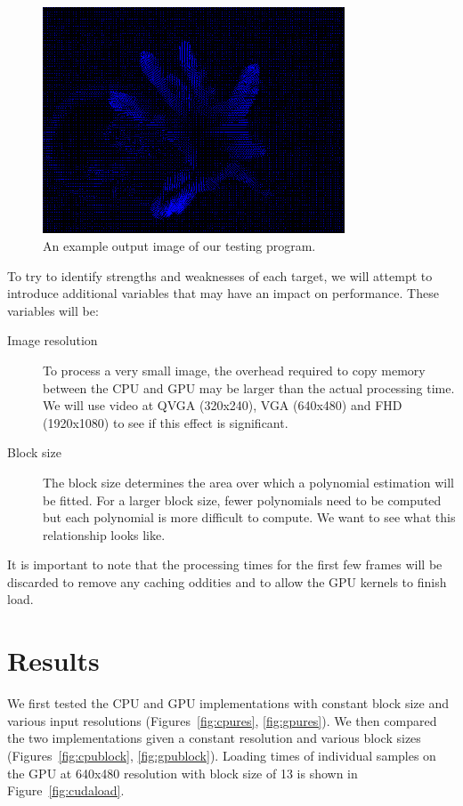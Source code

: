 \documentclass[12pt,letterpaper]{article}
\begin{document}
\begin{figure}[h]
  \centering
  \includegraphics[width=0.8\textwidth]{img/flow.png}
  \caption{An example output image of our testing program.}
  \label{fig:flow}
\end{figure}

To try to identify strengths and weaknesses of each target, we will attempt to
introduce additional variables that may have an impact on performance. These
variables will be:

\begin{description}
  \item[Image resolution] To process a very small image, the overhead required
    to copy memory between the CPU and GPU may be larger than the actual
    processing time. We will use video at QVGA (320x240), VGA (640x480) and FHD
    (1920x1080) to see if this effect is significant.
  \item[Block size] The block size determines the area over which a polynomial
    estimation will be fitted. For a larger block size, fewer polynomials need
    to be computed but each polynomial is more difficult to compute. We want to
    see what this relationship looks like.
\end{description}

It is important to note that the processing times for the first few frames will
be discarded to remove any caching oddities and to allow the GPU kernels to
finish load.

\section{Results}

We first tested the CPU and GPU implementations with constant block size and
various input resolutions (Figures~\ref{fig:cpures}, \ref{fig:gpures}). We then
compared the two implementations given a constant resolution and various block
sizes (Figures~\ref{fig:cpublock}, \ref{fig:gpublock}). Loading times of
individual samples on the GPU at 640x480 resolution with block size of 13 is
shown in Figure~\ref{fig:cudaload}.
\end{document}
